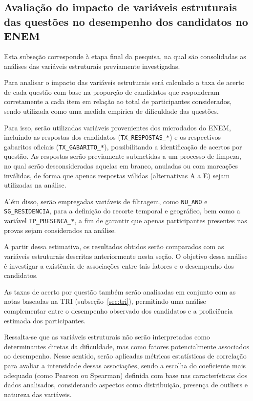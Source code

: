 \documentclass[a4paper,10pt, twocolumn]{article}
\begin{document}
\subsection{Avaliação do impacto de variáveis estruturais das questões no desempenho dos candidatos no ENEM}
\label{avaliacao-impacto-variaveis}
Esta subseção corresponde à etapa final da pesquisa, na qual são consolidadas as análises das variáveis estruturais previamente investigadas.

Para analisar o impacto das variáveis estruturais será calculado a taxa de acerto de cada questão com base na proporção de candidatos que responderam corretamente a cada item em relação ao total de participantes considerados, sendo utilizada como uma medida empírica de dificuldade das questões.

Para isso, serão utilizadas variáveis provenientes dos microdados do ENEM, incluindo as respostas dos candidatos (\texttt{TX\_RESPOSTAS\_*}) e os respectivos gabaritos oficiais (\texttt{TX\_GABARITO\_*}), possibilitando a identificação de acertos por questão. As respostas serão previamente submetidas a um processo de limpeza, no qual serão desconsideradas aquelas em branco, anuladas ou com marcações inválidas, de forma que apenas respostas válidas (alternativas A a E) sejam utilizadas na análise.

Além disso, serão empregadas variáveis de filtragem, como \texttt{NU\_ANO} e  \texttt{SG\_RESIDENCIA}, para a definição do recorte temporal e geográfico, bem como a variável \texttt{TP\_PRESENCA\_*}, a fim de garantir que apenas participantes presentes nas provas sejam considerados na análise.

A partir dessa estimativa, os resultados obtidos serão comparados com as variáveis estruturais descritas anteriormente nesta seção. O objetivo dessa análise é investigar a existência de associações entre tais fatores e o desempenho dos candidatos.

As taxas de acerto por questão também serão analisadas em conjunto com as notas baseadas na TRI (subseção~\ref{sec:tri}), permitindo uma análise complementar entre o desempenho observado dos candidatos e a proficiência estimada dos participantes.

Ressalta-se que as variáveis estruturais não serão interpretadas como determinantes diretas da dificuldade, mas como fatores potencialmente associados ao desempenho. Nesse sentido, serão aplicadas métricas estatísticas de correlação para avaliar a intensidade dessas associações, sendo a escolha do coeficiente mais adequado (como Pearson ou Spearman) definida com base nas características dos dados analisados, considerando aspectos como distribuição, presença de outliers e natureza das variáveis.
\end{document}
